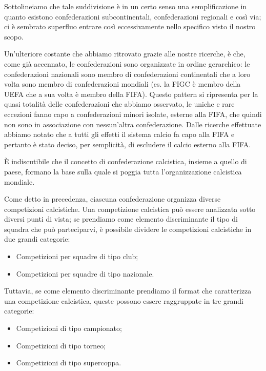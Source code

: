 Sottolineiamo che tale suddivisione è in un certo senso una semplificazione in quanto
esistono confederazioni subcontinentali, confederazioni regionali e così via; ci è sembrato
superfluo entrare così eccessivamente nello specifico visto il nostro scopo.

Un'ulteriore costante che abbiamo ritrovato grazie alle nostre ricerche, è che,
come già accennato, le confederazioni sono organizzate in ordine gerarchico: le confederazioni
nazionali sono membro di confederazioni continentali che a loro volta sono
membro di confederazioni mondiali (es. la FIGC è membro della UEFA che a sua volta è membro
della FIFA).
Questo pattern si ripresenta per la quasi totalità delle confederazioni che abbiamo osservato,
le uniche e rare eccezioni fanno capo a confederazioni minori isolate, esterne alla FIFA,
che quindi non sono in associazione con nessun'altra confederazione.
Dalle ricerche effettuate abbiamo notato che a tutti gli effetti il sistema calcio fa capo
alla FIFA e pertanto è stato deciso, per semplicità, di escludere il calcio esterno alla FIFA.

È indiscutibile che il concetto di confederazione calcistica, insieme a quello di paese,
formano la base sulla quale si poggia tutta l'organizzazione calcistica mondiale.

\bigskip
\bigskip

Come detto in precedenza, ciascuna confederazione organizza diverse competizioni calcistiche.
Una competizione calcistica può essere analizzata sotto diversi punti di vista;
se prendiamo come elemento discriminante il tipo di squadra che può parteciparvi, è possibile
dividere le competizioni calcistiche in due grandi categorie:
\begin{itemize}
	\item Competizioni per squadre di tipo club;
	\item Competizioni per squadre di tipo nazionale.
\end{itemize}

Tuttavia, se come elemento discriminante prendiamo il format che caratterizza una competizione
calcistica, queste possono essere raggruppate in tre grandi categorie:
\begin{itemize}
	\item Competizioni di tipo campionato;
	\item Competizioni di tipo torneo;
	\item Competizioni di tipo supercoppa.
\end{itemize}

